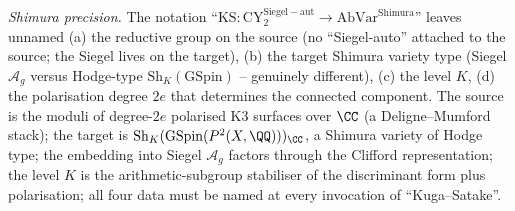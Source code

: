 \begin{theorem}
\emph{Shimura precision.} The notation
``$\mathrm{KS}\colon \mathrm{CY}_2^{\mathrm{Siegel-aut}}
\to \mathrm{AbVar}^{\mathrm{Shimura}}$'' leaves unnamed (a) the
reductive group on the source (no ``Siegel-auto'' attached to the
source; the Siegel lives on the target), (b) the target Shimura
variety type (Siegel $\mathcal{A}_g$ versus Hodge-type
$\mathrm{Sh}_K(\mathrm{GSpin})$ -- genuinely different), (c) the level
$K$, (d) the polarisation degree $2e$ that determines the connected
component.  The source is
the moduli of degree-$2e$ polarised K3 surfaces over $\CC$
(a Deligne--Mumford stack); the target is
$\mathrm{Sh}_K(\mathrm{GSpin}(P^2(X, \QQ)))_{\CC}$, a Shimura variety
of Hodge type; the embedding into Siegel $\mathcal{A}_g$ factors
through the Clifford representation; the level $K$ is the
arithmetic-subgroup stabiliser of the discriminant form plus
polarisation; all four data must be named at every invocation of
``Kuga--Satake''.
\end{theorem}

